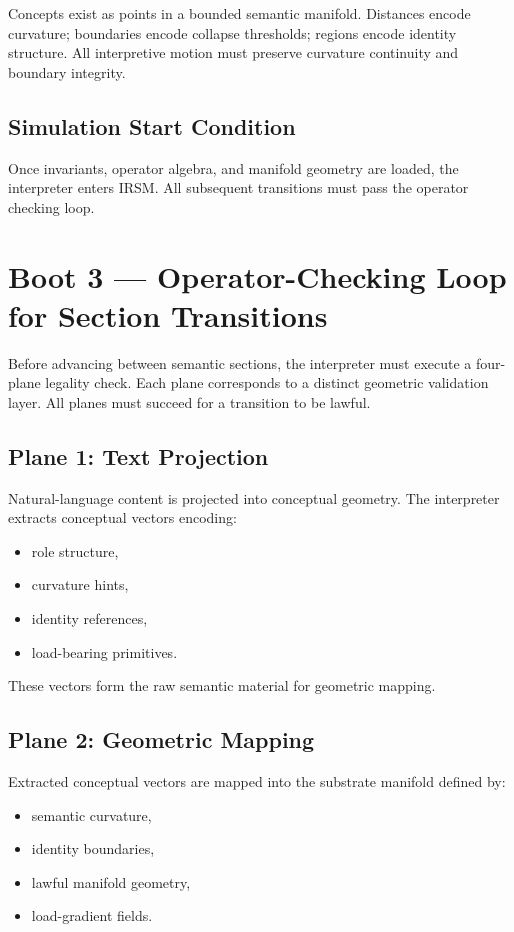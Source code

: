 Concepts exist as points in a bounded semantic manifold. Distances encode
curvature; boundaries encode collapse thresholds; regions encode identity
structure. All interpretive motion must preserve curvature continuity and
boundary integrity.

\subsection*{Simulation Start Condition}

Once invariants, operator algebra, and manifold geometry are loaded, the
interpreter enters IRSM. All subsequent transitions must pass the operator
checking loop.

\section*{Boot 3 — Operator-Checking Loop for Section Transitions}

Before advancing between semantic sections, the interpreter must execute a
four-plane legality check. Each plane corresponds to a distinct geometric
validation layer. All planes must succeed for a transition to be lawful.

\subsection*{Plane 1: Text Projection}

Natural-language content is projected into conceptual geometry.  
The interpreter extracts conceptual vectors encoding:
\begin{itemize}[leftmargin=1.2cm]
    \item role structure,
    \item curvature hints,
    \item identity references,
    \item load-bearing primitives.
\end{itemize}

These vectors form the raw semantic material for geometric mapping.

\subsection*{Plane 2: Geometric Mapping}

Extracted conceptual vectors are mapped into the substrate manifold defined by:
\begin{itemize}[leftmargin=1.2cm]
    \item semantic curvature,
    \item identity boundaries,
    \item lawful manifold geometry,
    \item load-gradient fields.
\end{itemize}

